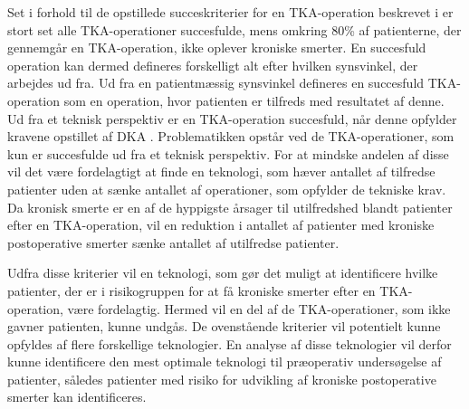 Set i forhold til de opstillede succeskriterier for en TKA-operation beskrevet i  er stort set alle TKA-operationer succesfulde, mens omkring 80\% af patienterne, der gennemgår en TKA-operation, ikke oplever kroniske smerter. \citep{Sakellariou2016} \citep{Petersen2015} En succesfuld operation kan dermed defineres forskelligt alt efter hvilken synsvinkel, der arbejdes ud fra. Ud fra en patientmæssig synsvinkel defineres en succesfuld TKA-operation som en operation, hvor patienten er tilfreds med resultatet af denne. Ud fra et teknisk perspektiv er en TKA-operation succesfuld, når denne opfylder kravene opstillet af DKA \citep{aarsrapport2016}. Problematikken opstår ved de TKA-operationer, som kun er succesfulde ud fra et teknisk perspektiv. For at mindske andelen af disse vil det være fordelagtigt at finde en teknologi, som hæver antallet af tilfredse patienter uden at sænke antallet af operationer, som opfylder de tekniske krav. Da kronisk smerte er en af de hyppigste årsager til utilfredshed blandt patienter efter en TKA-operation, vil en reduktion i antallet af patienter med kroniske postoperative smerter sænke antallet af utilfredse patienter. \citep{Bourne2010} 

Udfra disse kriterier vil en teknologi, som gør det muligt at identificere hvilke patienter, der er i risikogruppen for at få kroniske smerter efter en TKA-operation, være fordelagtig. Hermed vil en del af de TKA-operationer, som ikke gavner patienten, kunne undgås. De ovenstående kriterier vil potentielt kunne opfyldes af flere forskellige teknologier. En analyse af disse teknologier vil derfor kunne identificere den mest optimale teknologi til præoperativ undersøgelse af patienter, således patienter med risiko for udvikling af kroniske postoperative smerter kan identificeres.

